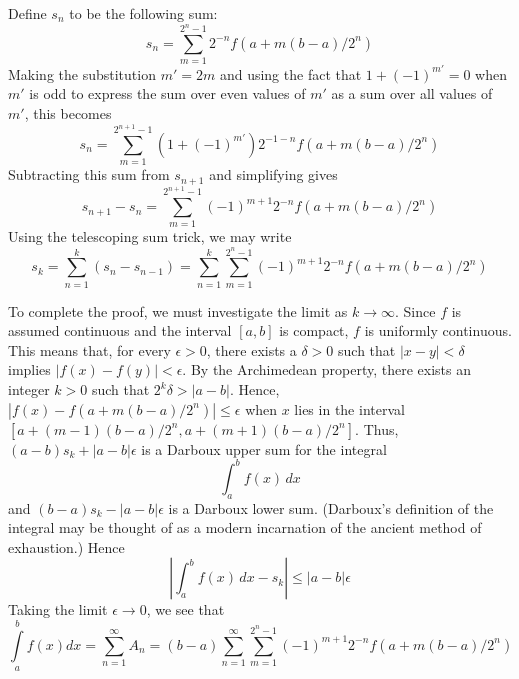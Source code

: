 \documentclass[12pt]{article}
\begin{document}
Define $s_n$ to be the following sum:
 $$s_n = \sum\limits_{m = 1}^{2^n - 1} 2^{ - n} f\left( {a + m(b - a)/2^n } \right)$$
Making the substitution $m' = 2m$ and using the fact that $1 + (-1)^{m'} = 0$ when $m'$ is odd to express the sum over even values of $m'$ as a sum over all values of $m'$, this becomes
 $$s_n = \sum\limits_{m = 1}^{2^{n+1} - 1} (1 + (-1)^{m'}) 2^{- 1 - n} f\left( {a + m(b - a)/2^n } \right)$$
Subtracting this sum from $s_{n+1}$ and simplifying gives
 $$s_{n+1} - s_n = \sum\limits_{m = 1}^{2^{n+1} - 1} (-1)^{m + 1} 2^{- n} f\left( {a + m(b - a)/2^n } \right)$$
Using the telescoping sum trick, we may write
 $$s_k = \sum_{n=1}^k (s_n - s_{n-1}) = \sum\limits_{n = 1}^k {\sum\limits_{m = 1}^{2^n - 1} {\left( { - 1} \right)^{m + 1} } } 2^{ - n} f\left( {a + m(b - a)/2^n } \right)$$

To complete the proof, we must investigate the limit as $k \to \infty$.  Since $f$ is assumed continuous and the interval $[a,b]$ is compact, $f$ is uniformly continuous.  This means that, for every $\epsilon > 0$, there exists a $\delta > 0$ such that $|x-y| < \delta$ implies $|f(x) - f(y)| < \epsilon$.  By the Archimedean property, there exists an integer $k > 0$ such that $2^k \delta > |a-b|$.  Hence, $|f(x) - f\left( {a + m(b - a)/2^n } \right)| \le \epsilon$ when $x$ lies in the interval $[a + (m-1) (b - a)/2^n, a + (m+1) (b - a)/2^n]$.  Thus, $(a - b) s_k + |a - b| \epsilon$ is a Darboux upper sum for the integral 
 $$\int_a^b f(x) \, dx$$
and $(b - a) s_k - |a - b| \epsilon$ is a Darboux lower sum.  (Darboux's definition of the integral may be thought of as a modern incarnation of the ancient method of exhaustion.)  Hence
 $$|\int_a^b f(x) \, dx - s_k| \le |a-b| \epsilon$$
Taking the limit $\epsilon \to 0$, we see that
\[
\int\limits_a^b {f(x)dx = \sum\limits_{n = 1}^\infty {A_n } = \left( {b - a} \right)} \sum\limits_{n = 1}^\infty {\sum\limits_{m = 1}^{2^n - 1} {\left( { - 1} \right)^{m + 1} } } 2^{ - n} f\left( {a + m(b - a)/2^n } \right)
\]
\end{document}
